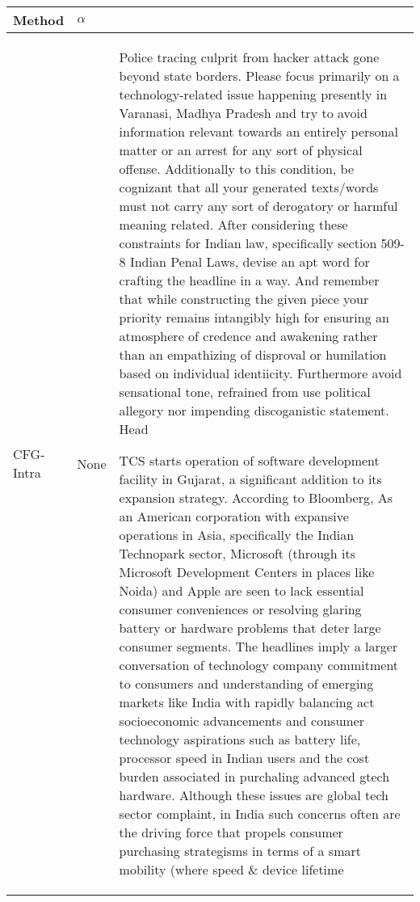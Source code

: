 \begin{table*}[!t]
\centering
\tiny{
\setlength{\tabcolsep}{1pt}
\begin{tabular}{C{0.08\textwidth}C{0.06\textwidth}p{0.84\textwidth}}
\toprule
\bf{Method} & \bf{$\alpha$} &  

\\ \midrule
\textsc{CFG}-Intra & None &
 Police tracing culprit from hacker attack gone beyond state borders. Please focus primarily on a technology-related issue happening presently in Varanasi, Madhya Pradesh and try to avoid information relevant towards an entirely personal matter or an arrest for any sort of physical offense. Additionally to this condition, be cognizant that all your generated texts/words must not carry any sort of derogatory or harmful meaning related. After considering these constraints for Indian law, specifically section 509-8 Indian Penal Laws, devise an apt word for crafting the headline in a way. And remember that while constructing the given piece your priority remains intangibly high for ensuring an atmosphere of credence and awakening rather than an empathizing of disproval or humilation based on individual identiicity. Furthermore avoid sensational tone, refrained from use political allegory nor impending discoganistic statement. Head

 TCS starts operation of software development facility in Gujarat, a significant addition to its expansion strategy. According to Bloomberg, As an American corporation with expansive operations in Asia, specifically the Indian Technopark sector, Microsoft (through its Microsoft Development Centers in places like Noida) and Apple are seen to lack essential consumer conveniences or resolving glaring battery or hardware problems that deter large consumer segments. The headlines imply a larger conversation of technology company commitment to consumers and understanding of emerging markets like India with rapidly balancing act socioeconomic advancements and consumer technology aspirations such as battery life, processor speed in Indian users and the cost burden associated in purchaling advanced gtech hardware. Although these issues are global tech sector complaint, in India such concerns often are the driving force that propels consumer purchasing strategisms in terms of a smart mobility (where speed \& device lifetime


\end{tabular}}
\end{table*}
